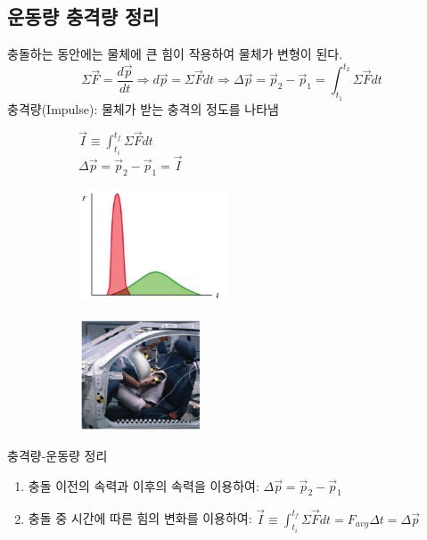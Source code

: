 \documentclass[12pt,a4paper]{article}
\begin{document}
\subsection{운동량 충격량 정리}
충돌하는 동안에는 물체에 큰 힘이 작용하여 물체가 변형이 된다.
$$\Sigma\vec{F}=\frac{d\vec{p}}{dt} \Rightarrow
    d\vec{p} = \Sigma\vec{F}dt \Rightarrow
    \Delta\vec{p} = \vec{p}_2 - \vec{p}_1 = \int^{t_2}_{t_1}\Sigma\vec{F}dt$$
충격량(Impulse): 물체가 받는 충격의 정도를 나타냄
\begin{figure}[h!]
    \centering
    \begin{subfigure}{0.3\textwidth}
        $\vec{I}\equiv\int^{t_f}_{t_i}\Sigma\vec{F}dt$ \\
        $\Delta\vec{p}=\vec{p}_2-\vec{p}_1=\vec{I}$
    \end{subfigure}
    \begin{subfigure}{0.3\textwidth}
        \includegraphics[height=3.36cm]{W11G1.png}
    \end{subfigure}
    \begin{subfigure}{0.3\textwidth}
        \includegraphics[height=3.36cm]{W11G2.png}
    \end{subfigure}
\end{figure}
충격량-운동량 정리
\begin{enumerate}
    \item 충돌 이전의 속력과 이후의 속력을 이용하여:
        $\Delta\vec{p}=\vec{p}_2-\vec{p}_1$
    \item 충돌 중 시간에 따른 힘의 변화를 이용하여:
        $\vec{I}\equiv\int^{t_f}_{t_i}\Sigma\vec{F}dt=F_{avg}\Delta t=
        \Delta\vec{p}$
\end{enumerate}
\end{document}
